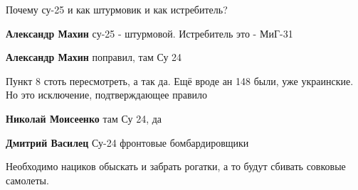 \begin{itemize}
Почему су-25 и как штурмовик и как истребитель?


\begin{itemize}
 
\textbf{Александр Махин} су-25 - штурмовой. Истребитель это - МиГ-31

 
\textbf{Александр Махин} поправил, там Су 24
\end{itemize}

\par
 

Пункт 8 стоть пересмотреть, а так да. Ещё вроде ан 148 были, уже украинские. Но
это исключение, подтверждающее правило

\begin{itemize}
 
\textbf{Николай Моисеенко} там Су 24, да

 
\textbf{Дмитрий Василец} Су-24 фронтовые бомбардировщики
\end{itemize}

 
Необходимо нациков обыскать и забрать рогатки, а то будут сбивать совковые
самолеты.


\end{itemize}
